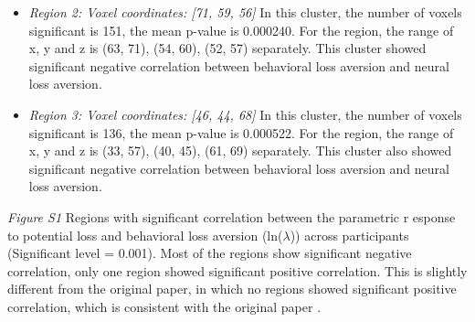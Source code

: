 \documentclass[11pt]{article}
\begin{document}
\begin{itemize}
\item \emph{Region 2: Voxel coordinates: [71, 59, 56]} In this cluster, the 
number of voxels significant is 151, the mean p-value is 0.000240. For the 
region, the range of x, y and z is (63, 71), (54, 60), (52, 57) separately. 
This cluster showed significant negative correlation between behavioral loss 
aversion and neural loss aversion.
\item \emph{Region 3: Voxel coordinates: [46, 44, 68]} In this cluster, the 
number of voxels significant is 136, the mean p-value is 0.000522. For the 
region, the range of x, y and z is (33, 57), (40, 45), (61, 69) separately. 
This cluster also showed significant negative correlation between behavioral 
loss aversion and neural loss aversion.

\end{itemize}

\newpage

\emph{Figure S1} Regions with significant correlation between the parametric r
esponse to potential loss and behavioral loss aversion (ln($\lambda$)) across 
participants (Significant level = 0.001).  Most of the regions show significant 
negative correlation, only one region showed significant positive correlation. 
This is slightly different from the original paper, in which no regions showed 
significant positive correlation, which is consistent with the original paper
\cite{Tom2007LossAversion}.
\end{document}
